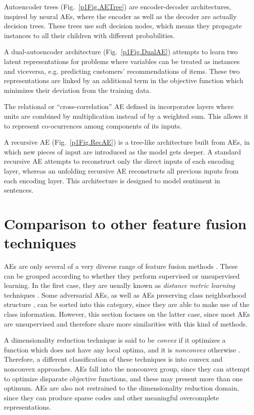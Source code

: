 Autoencoder trees  (Fig.~\ref{p1Fig.AETree}) are encoder-decoder architectures, inspired by neural AEs, where the encoder as well as the decoder are actually decision trees. These trees use soft decision nodes, which means they propagate instances to all their children with different probabilities. 

A dual-autoencoder architecture  (Fig.~\ref{p1Fig.DualAE}) attempts to learn two latent representations for problems where variables can be treated as instances and viceversa, e.g. predicting customers' recommendations of items. These two representations are linked by an additional term in the objective function which minimizes their deviation from the training data.

The relational or ``cross-correlation'' AE defined in  incorporates layers where units are combined by multiplication instead of by a weighted sum. This allows it to represent co-ocurrences among components of its inputs.

A recursive AE  (Fig.~\ref{p1Fig.RecAE}) is a tree-like architecture built from AEs, in which new pieces of input are introduced as the model gets deeper. A standard recursive AE attempts to reconstruct only the direct inputs of each encoding layer, whereas an unfolding recursive AE  reconstructs all previous inputs from each encoding layer. This architecture is designed to model sentiment in sentences.

\section{Comparison to other feature fusion techniques}\label{p1Sec.Relationship}

AEs are only several of a very diverse range of feature fusion methods . These can be grouped according to whether they perform supervised or unsupervised learning. In the first case, they are usually known as \textit{distance metric learning} techniques . Some adversarial AEs, as well as AEs preserving class neighborhood structure , can be sorted into this category, since they are able to make use of the class information. However, this section focuses on the latter case, since most AEs are unsupervised and therefore share more similarities with this kind of methods.

A dimensionality reduction technique is said to be \textit{convex} if it optimizes a function which does not have any local optima, and it is \textit{nonconvex} otherwise . Therefore, a different classification of these techniques is into convex and nonconvex approaches. AEs fall into the nonconvex group, since they can attempt to optimize disparate objective functions, and these may present more than one optimum. AEs are also not restrained to the dimensionality reduction domain, since they can produce sparse codes and other meaningful overcomplete representations.

